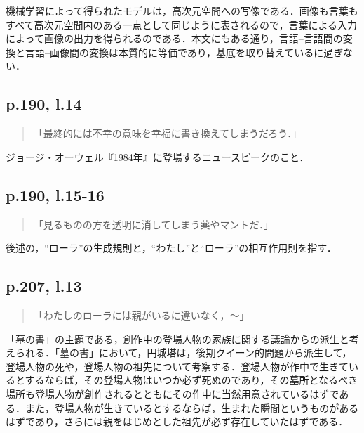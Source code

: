 \documentclass[10pt, a5paper, twoside]{jsarticle}
\theoremstyle{definition}
\begin{document}
			機械学習によって得られたモデルは，高次元空間への写像である．画像も言葉もすべて高次元空間内のある一点として同じように表されるので，言葉による入力によって画像の出力を得られるのである．本文にもある通り，言語--言語間の変換と言語--画像間の変換は本質的に等価であり，基底を取り替えているに過ぎない．

		\subsection{p.190, l.14}

			\begin{quote}

				「最終的には不幸の意味を幸福に書き換えてしまうだろう．」
				
			\end{quote}

			ジョージ・オーウェル『1984年』に登場するニュースピークのこと．

		\subsection{p.190, l.15-16}

			\begin{quote}

				「見るものの方を透明に消してしまう薬やマントだ．」
				
			\end{quote}

			後述の，“ローラ”の生成規則と，“わたし”と“ローラ”の相互作用則を指す．

		\subsection{p.207, l.13}

			\begin{quote}

				「わたしのローラには親がいるに違いなく，〜」
				
			\end{quote}

			「墓の書」の主題である，創作中の登場人物の家族に関する議論からの派生と考えられる．「墓の書」において，円城塔は，後期クイーン的問題から派生して，登場人物の死や，登場人物の祖先について考察する．登場人物が作中で生きているとするならば，その登場人物はいつか必ず死ぬのであり，その墓所となるべき場所も登場人物が創作されるとともにその作中に当然用意されているはずである．また，登場人物が生きているとするならば，生まれた瞬間というものがあるはずであり，さらには親をはじめとした祖先が必ず存在していたはずである．
\end{document}
